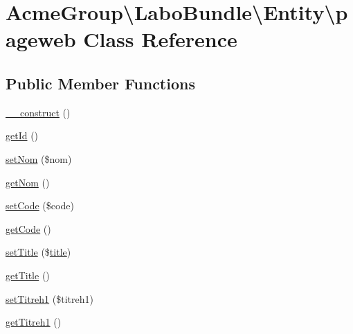\hypertarget{class_acme_group_1_1_labo_bundle_1_1_entity_1_1pageweb}{\section{Acme\+Group\textbackslash{}Labo\+Bundle\textbackslash{}Entity\textbackslash{}pageweb Class Reference}
\label{class_acme_group_1_1_labo_bundle_1_1_entity_1_1pageweb}
}
\subsection*{Public Member Functions}
\begin{DoxyCompactItemize}
\item 
\hyperlink{class_acme_group_1_1_labo_bundle_1_1_entity_1_1pageweb_a90af1b774b8a5f5e2e87860e696a34ff}{\+\_\+\+\_\+construct} ()
\item 
\hyperlink{class_acme_group_1_1_labo_bundle_1_1_entity_1_1pageweb_ae5a110bf227b5a9fe672f7834e2da67e}{get\+Id} ()
\item 
\hyperlink{class_acme_group_1_1_labo_bundle_1_1_entity_1_1pageweb_a4322646ddf7626a4e6406c19e8d6ce99}{set\+Nom} (\$nom)
\item 
\hyperlink{class_acme_group_1_1_labo_bundle_1_1_entity_1_1pageweb_a8cd369d48ba3a08e559ed79fdb143717}{get\+Nom} ()
\item 
\hyperlink{class_acme_group_1_1_labo_bundle_1_1_entity_1_1pageweb_af4f48b9a072318d8b9bb902f780658c4}{set\+Code} (\$code)
\item 
\hyperlink{class_acme_group_1_1_labo_bundle_1_1_entity_1_1pageweb_a90c1c67f36c8b3f0dbb26caad567aaa6}{get\+Code} ()
\item 
\hyperlink{class_acme_group_1_1_labo_bundle_1_1_entity_1_1pageweb_a51b60ee1654781e536ea9d7f17d0d51e}{set\+Title} (\$\hyperlink{jquery_8fancybox_8pack_8js_a293d418e53eecdc63689e8e677088684}{title})
\item 
\hyperlink{class_acme_group_1_1_labo_bundle_1_1_entity_1_1pageweb_a282e8e6028e442a5911679de4f7f4430}{get\+Title} ()
\item 
\hyperlink{class_acme_group_1_1_labo_bundle_1_1_entity_1_1pageweb_a0b32ef4ee20db46fe378038f1622a73c}{set\+Titreh1} (\$titreh1)
\item 
\hyperlink{class_acme_group_1_1_labo_bundle_1_1_entity_1_1pageweb_aa241da490b453555492b18488e516245}{get\+Titreh1} ()
\item 

\end{DoxyCompactItemize}
